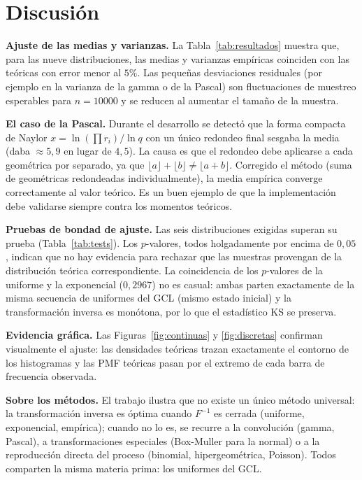 \documentclass[11pt]{article}
\begin{document}
\section{Discusi\'on}

\textbf{Ajuste de las medias y varianzas.} La Tabla~\ref{tab:resultados}
muestra que, para las nueve distribuciones, las medias y varianzas
emp\'iricas coinciden con las te\'oricas con error menor al $5\%$. Las
peque\~nas desviaciones residuales (por ejemplo en la varianza de la gamma
o de la Pascal) son fluctuaciones de muestreo esperables para $n = 10000$ y
se reducen al aumentar el tama\~no de la muestra.

\textbf{El caso de la Pascal.} Durante el desarrollo se detect\'o que la
forma compacta de Naylor $x=\ln(\prod r_i)/\ln q$ con un \'unico redondeo
final sesgaba la media (daba $\approx 5{,}9$ en lugar de $4{,}5$). La causa
es que el redondeo debe aplicarse a cada geom\'etrica por separado, ya que
$\lfloor a\rfloor+\lfloor b\rfloor\neq\lfloor a+b\rfloor$. Corregido el
m\'etodo (suma de geom\'etricas redondeadas individualmente), la media
emp\'irica converge correctamente al valor te\'orico. Es un buen ejemplo de
que la implementaci\'on debe validarse siempre contra los momentos
te\'oricos.

\textbf{Pruebas de bondad de ajuste.} Las seis distribuciones exigidas
superan su prueba (Tabla~\ref{tab:tests}). Los $p$-valores, todos
holgadamente por encima de $0{,}05$, indican que no hay evidencia para
rechazar que las muestras provengan de la distribuci\'on te\'orica
correspondiente. La coincidencia de los $p$-valores de la uniforme y la
exponencial ($0{,}2967$) no es casual: ambas parten exactamente de la misma
secuencia de uniformes del GCL (mismo estado inicial) y la transformaci\'on
inversa es mon\'otona, por lo que el estad\'istico KS se preserva.

\textbf{Evidencia gr\'afica.} Las Figuras~\ref{fig:continuas} y
\ref{fig:discretas} confirman visualmente el ajuste: las densidades
te\'oricas trazan exactamente el contorno de los histogramas y las PMF
te\'oricas pasan por el extremo de cada barra de frecuencia observada.

\textbf{Sobre los m\'etodos.} El trabajo ilustra que no existe un \'unico
m\'etodo universal: la transformaci\'on inversa es \'optima cuando $F^{-1}$
es cerrada (uniforme, exponencial, emp\'irica); cuando no lo es, se recurre a
la convoluci\'on (gamma, Pascal), a transformaciones especiales (Box-Muller
para la normal) o a la reproducci\'on directa del proceso (binomial,
hipergeom\'etrica, Poisson). Todos comparten la misma materia prima: los
uniformes del GCL.
\end{document}
